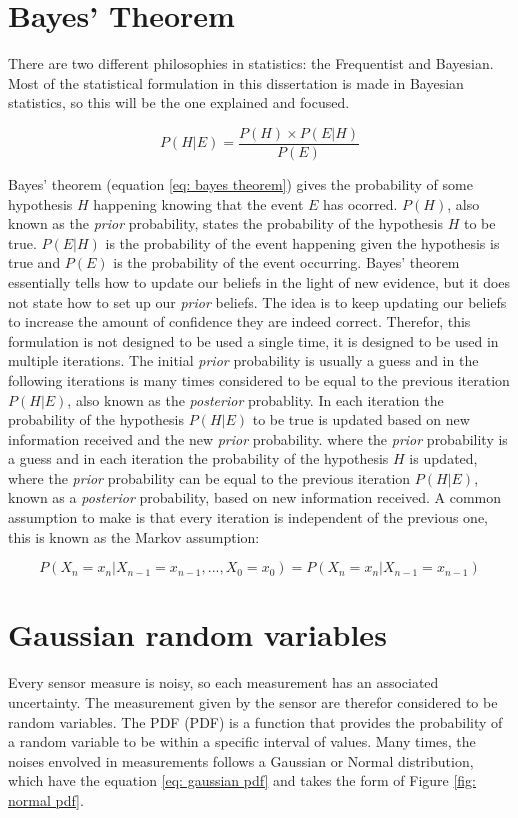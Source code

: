 \section{Bayes' Theorem}
There are two different philosophies in statistics: the Frequentist and Bayesian. Most of the statistical formulation in this dissertation is made in Bayesian statistics, so this will be the one explained and focused.

\begin{equation}
    \label{eq: bayes theorem}
    P(H|E) = \frac{P(H) \times P(E|H)}{P(E)}
\end{equation}

Bayes' theorem (equation \ref*{eq: bayes theorem}) gives the probability of some hypothesis $H$ happening knowing that the event $E$ has ocorred. $P(H)$, also known as the \textit{prior} probability, states the probability of the hypothesis $H$ to be true. $P(E|H)$ is the probability of the event happening given the hypothesis is true and $P(E)$ is the probability of the event occurring. Bayes' theorem essentially tells how to update our beliefs in the light of new evidence, but it does not state how to set up our \textit{prior} beliefs. The idea is to keep updating our beliefs to increase the amount of confidence they are indeed correct. Therefor, this formulation is not designed to be used a single time, it is designed to be used in multiple iterations. The initial \textit{prior} probability is usually a guess and in the following iterations is many times considered to be equal to the previous iteration $P(H|E)$, also known as the \textit{posterior} probablity. In each iteration the probability of the hypothesis $P(H|E)$ to be true is updated based on new information received and the new \textit{prior} probability.  where the \textit{prior} probability is a guess and in each iteration the probability of the hypothesis $H$ is updated, where the \textit{prior} probability can be equal to the previous iteration $P(H|E)$, known as a \textit{posterior} probability, based on new information received. A common assumption to make is that every iteration is independent of the previous one, this is known as the Markov assumption:

\begin{equation}
    P(X_n = x_n | X_{n-1} = x_{n-1}, ..., X_0 = x_0) = P(X_n = x_n | X_{n-1} = x_{n-1})
\end{equation}

\section{Gaussian random variables}
Every sensor measure is noisy, so each measurement has an associated uncertainty. The measurement given by the sensor are therefor considered to be random variables. The \acl*{PDF} (\acs*{PDF}) is a function that provides the probability of a random variable to be within a specific interval of values. Many times, the noises envolved in measurements follows a Gaussian or Normal distribution, which have the equation \ref*{eq: gaussian pdf} and takes the form of Figure \ref*{fig: normal pdf}.

